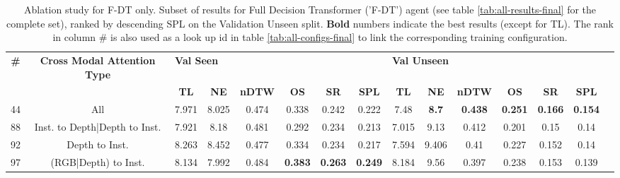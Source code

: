 \begin{table}
\centering
\caption{\label{tab:f_dt_full_dt_ablation}Ablation study for F-DT only. Subset of results for Full Decision Transformer ('F-DT') agent (see table \ref{tab:all-results-final} for the complete set), ranked by descending SPL on the Validation Unseen split. \textbf{Bold} numbers indicate the best results (except for TL). The rank in column \# is also used as a look up id in table \ref{tab:all-configs-final} to link the corresponding training configuration.}
\begin{tabular}{@{\hskip3pt}c@{\hskip3pt}c@{\hskip3pt}c@{\hskip3pt}c@{\hskip3pt}c@{\hskip3pt}c@{\hskip3pt}c@{\hskip3pt}c@{\hskip3pt}c@{\hskip3pt}c@{\hskip3pt}c@{\hskip3pt}c@{\hskip3pt}c@{\hskip3pt}c@{\hskip3pt}c}
\toprule
                                  \textbf{\#} & \textbf{Cross Modal Attention Type} & \multicolumn{6}{l}{\textbf{Val Seen}} & \multicolumn{6}{l}{\textbf{Val Unseen}} \\
\cmidrule(l){3-8}\cmidrule(l){9-14}\textbf{~} &                          \textbf{~} &       \textbf{TL} &    \textbf{NE} &   \textbf{nDTW} &     \textbf{OS} &     \textbf{SR} &    \textbf{SPL} &         \textbf{TL} &   \textbf{NE} &   \textbf{nDTW} &     \textbf{OS} &     \textbf{SR} &    \textbf{SPL} \\
\midrule
                                           44 &                                 All &             7.971 &          8.025 &           0.474 &           0.338 &           0.242 &           0.222 &                7.48 &  \textbf{8.7} &  \textbf{0.438} &  \textbf{0.251} &  \textbf{0.166} &  \textbf{0.154} \\
                                           88 &       Inst. to Depth|Depth to Inst. &             7.921 &           8.18 &           0.481 &           0.292 &           0.234 &           0.213 &               7.015 &          9.13 &           0.412 &           0.201 &            0.15 &            0.14 \\
                                           92 &                      Depth to Inst. &             8.263 &          8.452 &           0.477 &           0.334 &           0.234 &           0.217 &               7.594 &         9.406 &            0.41 &           0.227 &           0.152 &            0.14 \\
                                           97 &                (RGB|Depth) to Inst. &             8.134 &          7.992 &           0.484 &  \textbf{0.383} &  \textbf{0.263} &  \textbf{0.249} &               8.184 &          9.56 &           0.397 &           0.238 &           0.153 &           0.139 \\

\end{tabular}
\end{table}
